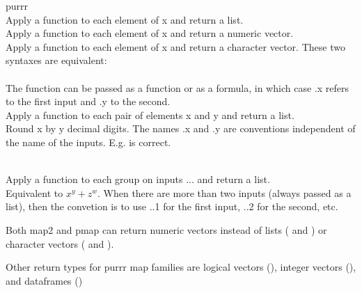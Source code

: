 
\vspace{2ex}

\begin{block}{purrr}
  \\Apply a function to each element of x and return a list.\br
  \\Apply a function to each element of x and return a numeric vector.\br
  \\Apply a function to each element of x and return a character vector.\br
  These two syntaxes are equivalent:\\
  \\
  \br
  The function can be passed as a function or as a formula, in which case .x refers to the first input and .y to the second.
  \\Apply a function to each pair of elements x and y and return a list.\br
  \\
  Round x by y decimal digits.\br
  The names .x and .y are conventions independent of the name of the inputs. E.g.  is correct.
  
  \\Apply a function to each group on inputs ... and return a list.\br
  \\
  Equivalent to $x ^ y + z ^ w$.\br
  When there are more than two inputs (always passed as a list), then the convetion is to use ..1 for the first input, ..2 for the second, etc.\br

  Both map2 and pmap can return numeric vectors instead of lists ( and ) or character vectors ( and ).\br

  Other return types for purrr map families are logical vectors (), integer vectors (), and dataframes ()


\end{block}